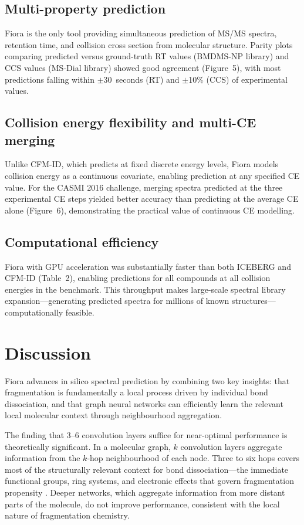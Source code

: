 \documentclass[11pt]{article}
\begin{document}
\subsection{Multi-property prediction}

Fiora is the only tool providing simultaneous prediction of MS/MS spectra, retention time, and collision cross section from molecular structure. Parity plots comparing predicted versus ground-truth RT values (BMDMS-NP library) and CCS values (MS-Dial library) showed good agreement (Figure~5), with most predictions falling within $\pm$30~seconds (RT) and $\pm$10\% (CCS) of experimental values.

\subsection{Collision energy flexibility and multi-CE merging}

Unlike CFM-ID, which predicts at fixed discrete energy levels, Fiora models collision energy as a continuous covariate, enabling prediction at any specified CE value. For the CASMI 2016 challenge, merging spectra predicted at the three experimental CE steps yielded better accuracy than predicting at the average CE alone (Figure~6), demonstrating the practical value of continuous CE modelling.

\subsection{Computational efficiency}

Fiora with GPU acceleration was substantially faster than both ICEBERG and CFM-ID (Table~2), enabling predictions for all compounds at all collision energies in the benchmark. This throughput makes large-scale spectral library expansion---generating predicted spectra for millions of known structures---computationally feasible.

\section{Discussion}

Fiora advances in silico spectral prediction by combining two key insights: that fragmentation is fundamentally a local process driven by individual bond dissociation, and that graph neural networks can efficiently learn the relevant local molecular context through neighbourhood aggregation.

The finding that 3--6 convolution layers suffice for near-optimal performance is theoretically significant. In a molecular graph, $k$ convolution layers aggregate information from the $k$-hop neighbourhood of each node. Three to six hops covers most of the structurally relevant context for bond dissociation---the immediate functional groups, ring systems, and electronic effects that govern fragmentation propensity \citep{allen2015cfm}. Deeper networks, which aggregate information from more distant parts of the molecule, do not improve performance, consistent with the local nature of fragmentation chemistry.
\end{document}
